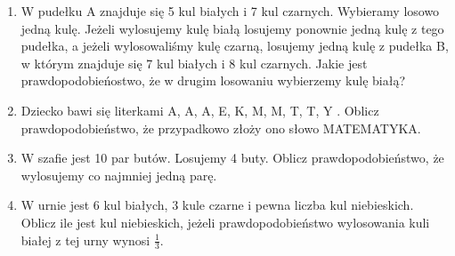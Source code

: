 \documentclass[12pt,a4paper]{article}
\begin{document}
\begin{enumerate}[1.]
	\item W pudełku A znajduje się 5 kul białych i 7 kul czarnych. Wybieramy losowo jedną kulę. Jeżeli wylosujemy kulę białą losujemy ponownie jedną kulę z tego pudełka, a jeżeli wylosowaliśmy kulę czarną, losujemy jedną kulę z pudełka B, w którym znajduje się 7 kul białych i 8 kul czarnych. Jakie jest prawdopodobieńostwo, że w drugim losowaniu wybierzemy kulę białą?
	
	\item Dziecko bawi się literkami A, A, A, E, K, M, M, T, T, Y . Oblicz prawdopodobieństwo, że przypadkowo złoży
	ono słowo MATEMATYKA.
	
	\item W szafie jest 10 par butów. Losujemy 4 buty. Oblicz prawdopodobieństwo, że wylosujemy co najmniej jedną parę.
	
	\item W urnie jest 6 kul białych, 3 kule czarne i pewna liczba kul niebieskich. Oblicz ile jest kul niebieskich, jeżeli prawdopodobieństwo wylosowania kuli białej z tej urny wynosi $\frac{1}{3}$. 
	\end{enumerate}

\newpage
\end{document}
